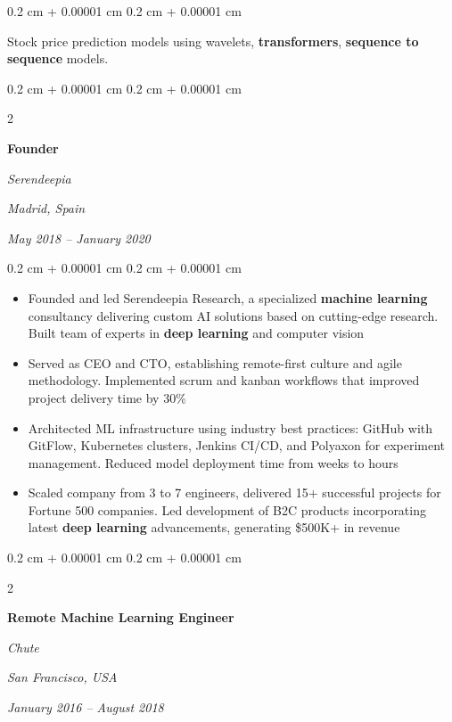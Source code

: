 \documentclass[10pt, letterpaper]{article}
\newenvironment{highlights}{
	\begin{itemize}[
		topsep=0.10 cm,
		parsep=0.10 cm,
		partopsep=0pt,
		itemsep=0pt,
		leftmargin=0.4 cm + 10pt
	]
	}{
	\end{itemize}
} %
\newenvironment{onecolentry}{
	\begin{adjustwidth}{
		0.2 cm + 0.00001 cm
	}{
		0.2 cm + 0.00001 cm
	}
	}{
	\end{adjustwidth}
} %
\newenvironment{twocolentry}[2][]{
	\onecolentry
	\def\secondColumn{#2}
	\setcolumnwidth{\fill, 5.5 cm}
	\begin{paracol}{2}
	}{
		\switchcolumn \raggedleft \secondColumn
	\end{paracol}
	\endonecolentry
} %
\begin{document}
	\vspace{0.10 cm}
	\begin{onecolentry}
		Stock price prediction models using wavelets, \textbf{transformers}, \textbf{sequence to sequence} models.
	\end{onecolentry}

	\vspace{0.2 cm}

	\begin{twocolentry}{
		\textit{Madrid, Spain}
		
		\textit{May 2018 – January 2020}}
		\textbf{Founder}
		
		\textit{Serendeepia}
	\end{twocolentry}

	\vspace{0.10 cm}
	\begin{onecolentry}
		\begin{highlights}
			\item Founded and led Serendeepia Research, a specialized \textbf{machine learning} consultancy delivering custom AI solutions based on cutting-edge research. Built team of experts in \textbf{deep learning} and computer vision
			\item Served as CEO and CTO, establishing remote-first culture and agile methodology. Implemented scrum and kanban workflows that improved project delivery time by 30\%
			\item Architected ML infrastructure using industry best practices: GitHub with GitFlow, Kubernetes clusters, Jenkins CI/CD, and Polyaxon for experiment management. Reduced model deployment time from weeks to hours
			\item Scaled company from 3 to 7 engineers, delivered 15+ successful projects for Fortune 500 companies. Led development of B2C products incorporating latest \textbf{deep learning} advancements, generating \$500K+ in revenue
		\end{highlights}
	\end{onecolentry}

	\vspace{0.2 cm}

	\begin{twocolentry}{
		\textit{San Francisco, USA}
		
		\textit{January 2016 – August 2018}}
		\textbf{Remote Machine Learning Engineer}
		
		\textit{Chute}
	\end{twocolentry}
\end{document}
